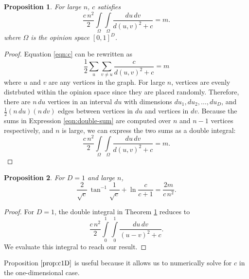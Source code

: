 \documentclass[a4paper,10pt]{article}
\newtheorem{prop}{Proposition}
\begin{document}
\begin{prop}
\label{prop:c}
For large $n$, $c$ satisfies
 \begin{equation}
  \frac{c\,n^2}{2} \int\limits_\Omega \int\limits_\Omega \frac{du \, dv}{d(u, v)^2 + c} = m.
 \end{equation}
where $\Omega$ is the opinion space $[0, 1]^D$.
\end{prop}
\begin{proof}
 Equation \ref{eqn:c} can be rewritten as
 \begin{equation}
 \label{eqn:double-sum}
  \frac{1}{2} \sum\limits_{u}\sum\limits_{v \neq u} \frac{c}{d(u, v)^2 + c} = m
 \end{equation}
 where $u$ and $v$ are any vertices in the graph. For large $n$, vertices are evenly distrbuted within the opinion space since they are placed randomly. Therefore, there are $n \,du$ vertices in an interval $du$ with dimensions $du_1, du_2, \ldots, du_D$, and $\frac{1}{2}(n\, du)(n\, dv)$ edges between vertices in $du$ and vertices in $dv$. Because the sums in Expression \ref{eqn:double-sum} are computed over $n$ and $n - 1$ vertices respectively, and $n$ is large, we can express the two sums as a double integral:
 \begin{equation}
  \frac{c\,n^2}{2} \int\limits_\Omega \int\limits_\Omega \frac{du \, dv}{d(u, v)^2 + c} = m.
 \end{equation}
\end{proof}
\begin{prop}
\label{prop:c1D}
 For $D=1$ and large $n$,
 \begin{equation*}
  \frac{2}{\sqrt{c}}\,\tan^{-1} \frac{1}{\sqrt{c}} + \ln\frac{c}{c+1} = \frac{2m}{c\,n^2}.
 \end{equation*}
\end{prop}
\begin{proof}
For $D=1$, the double integral in Theorem \ref{prop:c} reduces to
 \begin{equation}
  \frac{c\,n^2}{2} \int\limits_0^1 \int\limits_0^1 \frac{du \, dv}{(u - v)^2 + c}.
 \end{equation}
We evaluate this integral to reach our result.
\end{proof}
Proposition $\ref{prop:c1D}$ is useful because it allows us to numerically solve for $c$ in the one-dimensional case.
\end{document}
